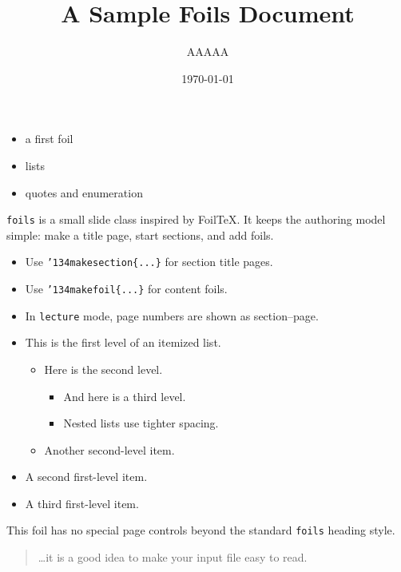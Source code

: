 \documentclass[lecture]{foils}
\title{A Sample Foils Document}
\author{AAAAA}
\date{\today}
\newcommand{\bs}{\char '134}
\begin{document}
\maketitle

\vf
\begin{itemize}\itemsep=20pt
  \item a first foil
  \item lists
  \item quotes and enumeration
\end{itemize}
\vf

\texttt{foils} is a small slide class inspired by FoilTeX.  It keeps the authoring
model simple: make a title page, start sections, and add foils.

\begin{itemize}
  \item Use \texttt{\bs makesection\{...\}} for section title pages.
  \item Use \texttt{\bs makefoil\{...\}} for content foils.
  \item In \texttt{lecture} mode, page numbers are shown as
        section--page.
\end{itemize}

\begin{itemize}
  \item This is the first level of an itemized list.
    \begin{itemize}
      \item Here is the second level.
        \begin{itemize}
          \item And here is a third level.
          \item Nested lists use tighter spacing.
        \end{itemize}
      \item Another second-level item.
    \end{itemize}
  \item A second first-level item.
  \item A third first-level item.
\end{itemize}

This foil has no special page controls beyond the standard \texttt{foils} heading style.

\begin{quote}
\ldots it is a good idea to make your input file easy to read.
\end{quote}
\end{document}
